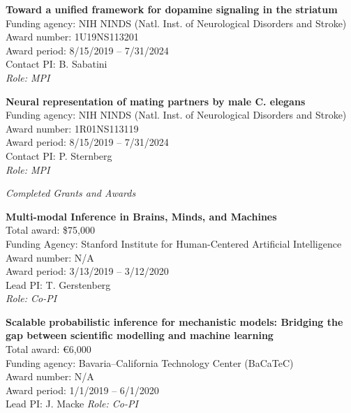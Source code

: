 \documentclass[10pt]{article}
\begin{document}
\begin{outerlist}
\item \textbf{Toward a unified framework for dopamine signaling in the striatum} \\
  Funding agency: NIH NINDS (Natl. Inst. of Neurological Disorders and Stroke) \\
  Award number: 1U19NS113201 \\
  Award period: 8/15/2019 -- 7/31/2024 \\
  Contact PI: B. Sabatini \\
  \textit{Role: MPI}

\item \textbf{Neural representation of mating partners by male C. elegans}\\
  Funding agency: NIH NINDS (Natl. Inst. of Neurological Disorders and Stroke) \\
  Award number: 1R01NS113119 \\
  Award period: 8/15/2019 -- 7/31/2024 \\
  Contact PI: P. Sternberg\\
  \textit{Role: MPI}

\end{outerlist}

\vspace{1em}

\textit{Completed Grants and Awards}

\begin{outerlist}
\item \textbf{Multi-modal Inference in Brains, Minds, and Machines} \\
  Total award: \$75,000 \\
  Funding Agency: Stanford Institute for Human-Centered Artificial Intelligence \\
  Award number: N/A \\
  Award period: 3/13/2019 -- 3/12/2020 \\
  Lead PI: T. Gerstenberg \\
  \textit{Role: Co-PI}

\item \textbf{Scalable probabilistic inference for mechanistic models: Bridging the
    gap between scientific modelling and machine learning} \\
  Total award: \euro{}6,000\\
  Funding agency: Bavaria--California Technology Center (BaCaTeC)\\
  Award number: N/A \\
  Award period: 1/1/2019 -- 6/1/2020 \\
  Lead PI: J. Macke
  \textit{Role: Co-PI}

\end{outerlist}
\end{document}
